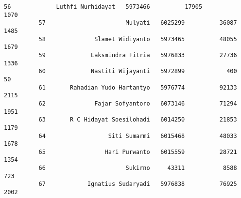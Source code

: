 \documentclass[11pt]{article}
\begin{document}
\begin{Verbatim}[commandchars=\\\{\}]
          56             Luthfi Nurhidayat   5973466          17905              1070   
          57                       Mulyati   6025299          36087              1485   
          58              Slamet Widiyanto   5973465          48055              1679   
          59             Laksmindra Fitria   5976833          27736              1336   
          60             Nastiti Wijayanti   5972899            400                50   
          61       Rahadian Yudo Hartantyo   5976774          92133              2115   
          62              Fajar Sofyantoro   6073146          71294              1951   
          63       R C Hidayat Soesilohadi   6014250          21853              1179   
          64                  Siti Sumarmi   6015468          48033              1678   
          65                 Hari Purwanto   6015559          28721              1354   
          66                       Sukirno     43311           8588               723   
          67            Ignatius Sudaryadi   5976838          76925              2002   
          

\end{Verbatim}
\end{document}
